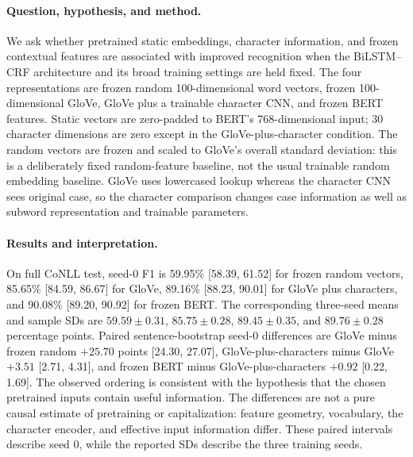 \paragraph{Question, hypothesis, and method.}
We ask whether pretrained static embeddings, character information, and frozen
contextual features are associated with improved recognition when the
BiLSTM--CRF architecture and its broad training settings are held fixed. The
four representations are frozen random 100-dimensional word vectors, frozen
100-dimensional GloVe, GloVe plus a trainable character CNN, and frozen BERT
features. Static vectors are zero-padded to BERT's 768-dimensional input;
30 character dimensions are zero except in the GloVe-plus-character condition.
The random vectors are frozen and scaled to GloVe's overall standard deviation:
this is a deliberately fixed random-feature baseline, not the usual trainable
random embedding baseline. GloVe uses lowercased lookup whereas the character
CNN sees original case, so the character comparison changes case information
as well as subword representation and trainable parameters.

\paragraph{Results and interpretation.}
On full CoNLL test, seed-0 F1 is 59.95\% [58.39, 61.52] for frozen random
vectors, 85.65\% [84.59, 86.67] for GloVe, 89.16\% [88.23, 90.01] for
GloVe plus characters, and 90.08\% [89.20, 90.92] for frozen BERT. The
corresponding three-seed means and sample SDs are $59.59\pm0.31$,
$85.75\pm0.28$, $89.45\pm0.35$, and $89.76\pm0.28$ percentage points.
Paired sentence-bootstrap seed-0 differences are GloVe minus frozen random
$+25.70$ points [24.30, 27.07], GloVe-plus-characters minus GloVe $+3.51$
[2.71, 4.31], and frozen BERT minus GloVe-plus-characters $+0.92$ [0.22,
1.69]. The observed ordering is consistent with the hypothesis that the chosen
pretrained inputs contain useful information. The differences are not a pure
causal estimate of pretraining or capitalization: feature geometry,
vocabulary, the character encoder, and effective input information differ.
These paired intervals describe seed 0, while the reported SDs describe the
three training seeds.

